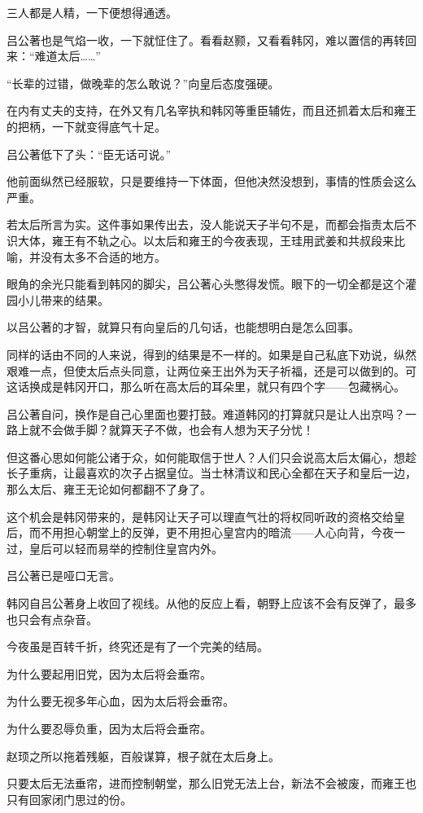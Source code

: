 三人都是人精，一下便想得通透。

吕公著也是气焰一收，一下就怔住了。看看赵颢，又看看韩冈，难以置信的再转回来：“难道太后……”

“长辈的过错，做晚辈的怎么敢说？”向皇后态度强硬。

在内有丈夫的支持，在外又有几名宰执和韩冈等重臣辅佐，而且还抓着太后和雍王的把柄，一下就变得底气十足。

吕公著低下了头：“臣无话可说。”

他前面纵然已经服软，只是要维持一下体面，但他决然没想到，事情的性质会这么严重。

若太后所言为实。这件事如果传出去，没人能说天子半句不是，而都会指责太后不识大体，雍王有不轨之心。以太后和雍王的今夜表现，王珪用武姜和共叔段来比喻，并没有太多不合适的地方。

眼角的余光只能看到韩冈的脚尖，吕公著心头憋得发慌。眼下的一切全都是这个灌园小儿带来的结果。

以吕公著的才智，就算只有向皇后的几句话，也能想明白是怎么回事。

同样的话由不同的人来说，得到的结果是不一样的。如果是自己私底下劝说，纵然艰难一点，但使太后点头同意，让两位亲王出外为天子祈福，还是可以做到的。可这话换成是韩冈开口，那么听在高太后的耳朵里，就只有四个字——包藏祸心。

吕公著自问，换作是自己心里面也要打鼓。难道韩冈的打算就只是让人出京吗？一路上就不会做手脚？就算天子不做，也会有人想为天子分忧！

但这番心思如何能公诸于众，如何能取信于世人？人们只会说高太后太偏心，想趁长子重病，让最喜欢的次子占据皇位。当士林清议和民心全都在天子和皇后一边，那么太后、雍王无论如何都翻不了身了。

这个机会是韩冈带来的，是韩冈让天子可以理直气壮的将权同听政的资格交给皇后，而不用担心朝堂上的反弹，更不用担心皇宫内的暗流——人心向背，今夜一过，皇后可以轻而易举的控制住皇宫内外。

吕公著已是哑口无言。

韩冈自吕公著身上收回了视线。从他的反应上看，朝野上应该不会有反弹了，最多也只会有点杂音。

今夜虽是百转千折，终究还是有了一个完美的结局。

为什么要起用旧党，因为太后将会垂帘。

为什么要无视多年心血，因为太后将会垂帘。

为什么要忍辱负重，因为太后将会垂帘。

赵顼之所以拖着残躯，百般谋算，根子就在太后身上。

只要太后无法垂帘，进而控制朝堂，那么旧党无法上台，新法不会被废，而雍王也只有回家闭门思过的份。

